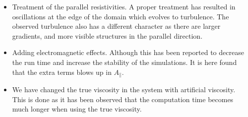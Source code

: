 \begin{itemize}[noitemsep,nolistsep]
    \item Treatment of the parallel resistivities.
        A proper treatment has resulted in oscillations at the edge of the domain which evolves to turbulence.
        The observed turbulence also has a different character as there are larger gradients, and more visible structures in the parallel direction.
    \item Adding electromagnetic effects.
        Although this has been reported to decrease the run time and increase the stability of the simulations.
        It is here found that the extra terms blows up in $A_\|$.
    \item We have changed the true viscosity in the system with artificial viscosity.
        This is done as it has been observed that the computation time becomes much longer when using the true viscosity.
\end{itemize}
